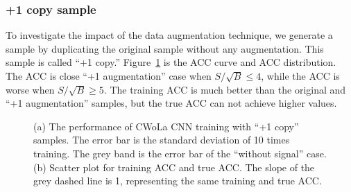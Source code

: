 \documentclass[12pt]{article}
\begin{document}
		\subsubsection{+1 copy sample}%
		\label{subs:_1_copy_sample}
			To investigate the impact of the data augmentation technique, we generate a sample by duplicating the original sample without any augmentation. This sample is called ``+1 copy.''
			Figure~\ref{fig:cwola_cnn_training_performance_copy_1} is the ACC curve and ACC distribution. The ACC is close ``+1 augmentation'' case when $S / \sqrt{B} \le 4$, while the ACC is worse when $S / \sqrt{B} \ge 5$. The training ACC is much better than the original and ``+1 augmentation'' samples, but the true ACC can not achieve higher values.
			\begin{figure}[htpb]
				\centering
				\caption{(a) The performance of CWoLa CNN training with ``+1 copy'' samples. The error bar is the standard deviation of 10 times training. The grey band is the error bar of the ``without signal'' case. (b) Scatter plot for training ACC and true ACC. The slope of the grey dashed line is 1, representing the same training and true ACC.}
				\label{fig:cwola_cnn_training_performance_copy_1}
			\end{figure}
\end{document}
